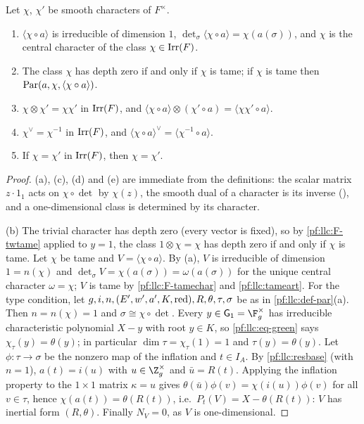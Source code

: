 \begin{lemma}[Characters]\label{pf:llc:parone}
Let $\chi$, $\chi'$ be smooth characters of $F^\times$.
\begin{enumerate}[label=(\alph*)]
\item $\langle\chi\circ a\rangle$ is irreducible of dimension $1$, $\det_\sigma\langle\chi\circ a\rangle=\chi(a(\sigma))$,
  and $\chi$ is the central character of the class $\chi\in\operatorname{Irr}(F)$.
\item The class $\chi$ has depth zero if and only if $\chi$ is tame; if $\chi$ is tame then
  $\operatorname{Par}(a,\chi,\langle\chi\circ a\rangle)$.
\item $\chi\otimes\chi'=\chi\chi'$ in $\operatorname{Irr}(F)$, and $\langle\chi\circ a\rangle\otimes(\chi'\circ a)=\langle\chi\chi'\circ
  a\rangle$.
\item $\chi^\vee=\chi^{-1}$ in $\operatorname{Irr}(F)$, and $\langle\chi\circ a\rangle^\vee=\langle\chi^{-1}\circ a\rangle$.
\item If $\chi=\chi'$ in $\operatorname{Irr}(F)$, then $\chi=\chi'$.
\end{enumerate}
\end{lemma}

\begin{proof}
(a), (c), (d) and (e) are immediate from the definitions: the scalar matrix $z\cdot1_1$ acts on $\chi\circ\det$
by $\chi(z)$, the smooth dual of a character is its inverse
(), and a one-dimensional class is
determined by its character.

(b) The trivial character has depth zero (every vector is fixed), so by \ref{pf:llc:F-twtame} applied to
$y=1$, the class $1\otimes\chi=\chi$ has depth zero if and only if $\chi$ is tame. Let $\chi$ be tame and
$V=\langle\chi\circ a\rangle$. By (a), $V$ is irreducible of dimension $1=n(\chi)$ and
$\det_\sigma V=\chi(a(\sigma))=\omega(a(\sigma))$ for the unique central character $\omega=\chi$; $V$ is tame by
\ref{pf:llc:F-tamechar} and \cref{pf:llc:tameart}. For the type condition, let $g,i,n,(E',w',a',K,\operatorname{red}),R,
\theta,\tau,\sigma$ be as in \cref{pf:llc:def-par}(a). Then $n=n(\chi)=1$ and $\sigma\cong\chi\circ\det$. Every
$y\in\llcG_1=\F_g^\times$ has irreducible characteristic polynomial $X-y$ with root $y\in K$, so
\eqref{pf:llc:eq-green} says $\chi_\tau(y)=\theta(y)$; in particular $\dim\tau=\chi_\tau(1)=1$ and $\tau(y)=\theta(y)$.
Let $\phi\colon\tau\to\sigma$ be the nonzero map of the inflation and $t\in I_A$. By \cref{pf:llc:resbase} (with
$n=1$), $a(t)=i(u)$ with $u\in\Z_g^\times$ and $\bar u=R(t)$. Applying the inflation property to the $1\times1$
matrix $\kappa=u$ gives $\theta(\bar u)\phi(v)=\chi(i(u))\phi(v)$ for all $v\in\tau$, hence
$\chi(a(t))=\theta(R(t))$, i.e.\ $P_t(V)=X-\theta(R(t))$: $V$ has inertial form $(R,\theta)$. Finally $N_V=0$, as
$V$ is one-dimensional.
\end{proof}


